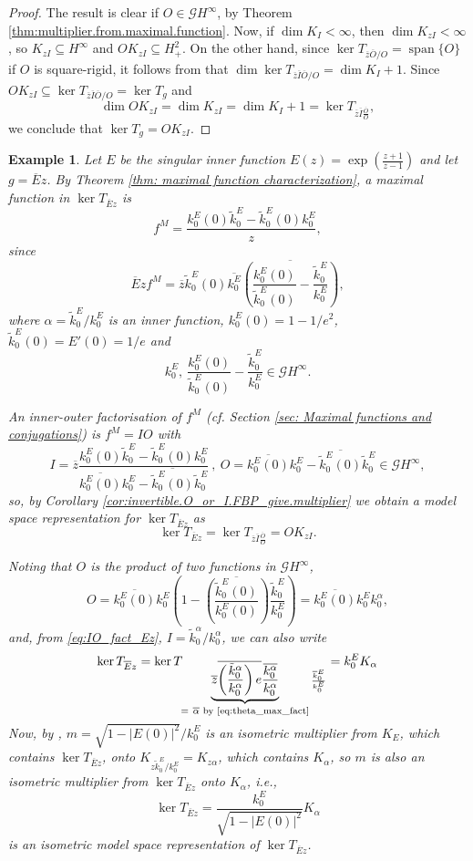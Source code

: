 \documentclass[12pt]{elsarticle}
\numberwithin{equation}{section}
\theoremstyle{plain}
\newtheorem{ex}[thm]{Example}
\newcommand{\Hp}{\ensuremath{H^2_+}}
\newcommand{\Hinf}{\ensuremath{H^\infty}}
\newcommand{\GG}{\ensuremath{\mathcal{G}}}
\newcommand{\ol}[1]{\ensuremath{\overline{#1}}}
\newcommand{\annot}[2]{\underbrace{#1}_{\smash[b]{\scriptstyle #2}}}
\newcommand{\spn}{\ensuremath{\operatorname{span}}}
\renewcommand{\subset}{\subseteq}
\begin{document}
\begin{proof}
The result is clear if $O \in \GG\Hinf$, by Theorem \ref{thm:multiplier.from.maximal.function}.
Now, if $\dim K_I < \infty$, then $\dim K_{zI} < \infty$, so $K_{zI} \subset \Hinf$ and $O K_{zI} \subset \Hp$.
On the other hand, since $\ker T_{\ol z \ol O /O} = \spn\{ O \}$ if $O$ is square-rigid, it follows from \cite[Theorem 6.2]{CMP16} that $\dim \ker T_{\ol z \ol I \ol O/ O} = \dim K_I + 1$.
Since $O K_{zI} \subset \ker T_{\ol z \ol I \ol O  / O} = \ker T_g$
and
\[
\dim O K_{zI} = \dim K_{zI} = \dim K_I +1 = \ker T_{\ol z \ol I \frac{\ol O}{O}},
\]
we conclude that $\ker T_g = O K_{zI}$.
\end{proof}


\begin{ex}
Let $E$ be the singular inner function $E(z) = \exp\left( \frac{z+1}{z-1} \right)$ and let $g=\ol E z$.
By Theorem \ref{thm: maximal function characterization}, a maximal function in $\ker T_{\ol E z}$ is
\[
f^M = \frac{k^E_0 (0) \tilde k^E_0 - \tilde k^E_0 (0) k^E_0}{z},
\]
since
\[
\ol E z f^M = \ol z \tilde k^E_0 (0) \ol{k^E_0} \ol{ \left( \frac{k^E_0 (0)}{\tilde k^E_0 (0)} - \frac{\tilde k^E_0}{k^E_0} \right) },
\]
where $\alpha = \tilde k^E_0 / k^E_0$ is an inner function, $k^E_0 (0) = 1- 1/e^2$, $\tilde k^E_0 (0) = E'(0) = 1/e$ and
\[
k^E_0,\ \frac{k^E_0 (0)}{\tilde k^E_0 (0)} - \frac{\tilde k^E_0}{k^E_0} \in \GG\Hinf.
\]

An inner-outer factorisation of $f^M$ (cf. Section \ref{sec: Maximal functions and conjugations}) is $f^M = IO$ with
\begin{equation}
\label{eq:IO_fact_Ez}
I = \ol z \frac{k^E_0 (0) \tilde k^E_0 - \tilde k^E_0 (0) k^E_0}{\ol{k^E_0 (0)} k^E_0 - \ol{\tilde k^E_0 (0)} \tilde k^E_0}
\ , \ 
O = \ol{k^E_0 (0)} k^E_0 - \ol{\tilde k^E_0 (0)} \tilde k^E_0 \in \GG\Hinf,
\end{equation}
so, by Corollary \ref{cor:invertible.O_or_I.FBP_give.multiplier} we obtain a model space representation for $\ker T_{\ol E z}$ as
\[
\ker T_{\ol E z} = \ker T_{\ol z \ol I \frac{\ol O}{O}} = O K_{zI}.
\]

Noting that $O$ is the product of two functions in \GG\Hinf,
\[
O = 
\ol{k^E_0 (0)} k^E_0 \left( 1 - \ol{ \left( \frac{\tilde k^E_0 (0)}{k^E_0 (0)} \right) } \frac{\tilde k^E_0}{k^E_0} \right) = 
\ol{k^E_0 (0)} k^E_0 k^\alpha_0,
\]
and, from \eqref{eq:IO_fact_Ez}, $I = \tilde k^\alpha_0 / k^\alpha_0$, we can also write
\[
\ker T_{\ol E z} = \ker T_{
\annot{\ol z \ol{ \left( \frac{\tilde k^\alpha_0}{k^\alpha_0} \right) e} \frac{\ol{ k^\alpha_0}}{k^\alpha_0}
}{=\ \ol\alpha \text{ by \eqref{eq:theta_max_fact}}
}
\frac{\ol k^E_0}{k^E_0}} = k^E_0 K_\alpha
\]
Now, by \cite[Theorem 10]{Cro94}, $m = \sqrt{1 - |E(0)|^2} / k^E_0$ is an isometric multiplier from $K_E$, which contains $\ker T_{\ol E z}$, onto $K_{z \tilde k^E_0 / k^E_0} = K_{z\alpha}$, which contains $K_\alpha$, so $m$ is also an isometric multiplier from $\ker T_{\ol E z}$ onto $K_\alpha$, i.e.,
\[
\ker T_{\ol E z} = \frac{k^E_0}{\sqrt{1 - |E(0)|^2}} K_\alpha
\]
is an isometric model space representation of $\ker T_{\ol E z}$.
\end{ex}
\end{document}
